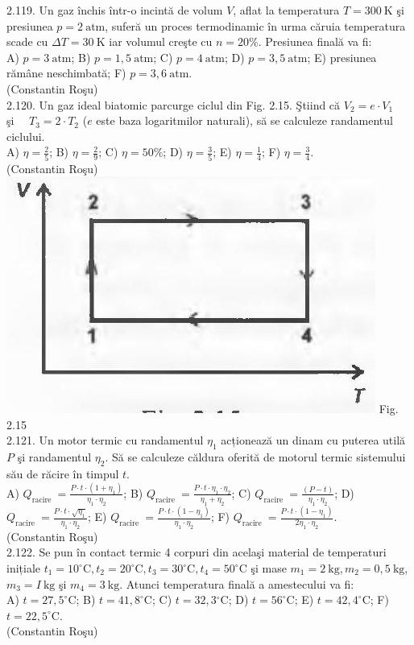 2.119. Un gaz închis într-o incintă de volum $V$, aflat la temperatura $T=300 \mathrm{~K}$ şi presiunea $p=2 \mathrm{~atm}$, suferă un proces termodinamic în urma căruia temperatura scade cu $\Delta T=30 \mathrm{~K}$ iar volumul creşte cu $n=20 \%$. Presiunea finală va fi:\\ A) $p=3 \mathrm{~atm}$; B) $p=1,5 \mathrm{~atm}$; C) $p=4 \mathrm{~atm}$; D) $p=3,5 \mathrm{~atm}$; E) presiunea rămâne neschimbată; F) $p=3,6 \mathrm{~atm}$.\\ (Constantin Roşu)\\

2.120. Un gaz ideal biatomic parcurge ciclul din Fig. 2.15. Ştiind că $V_{2}=e \cdot V_{1} \quad$ şi $\quad T_{3}=2 \cdot T_{2}$ ($e$ este baza logaritmilor naturali), să se calculeze randamentul ciclului.\\ A) $\eta=\frac{2}{5}$; B) $\eta=\frac{2}{9}$; C) $\eta=50 \%$; D) $\eta=\frac{3}{5}$; E) $\eta=\frac{1}{4}$; F) $\eta=\frac{3}{4}$.\\ (Constantin Roşu)\\ \includegraphics[width=0.4\linewidth]{images/2025_07_01_5b3ff9fa0d508c8e9f17g-100} Fig. 2.15\\

2.121. Un motor termic cu randamentul $\eta_{1}$ acționează un dinam cu puterea utilă $P$ şi randamentul $\eta_{2}$. Să se calculeze căldura oferită de motorul termic sistemului său de răcire în timpul $t$.\\ A) $Q_{\text {racire }}=\frac{P \cdot t \cdot\left(1+\eta_{1}\right)}{\eta_{1} \cdot \eta_{2}}$; B) $Q_{\text {racire }}=\frac{P \cdot t \cdot \eta_{1} \cdot \eta_{2}}{\eta_{1}+\eta_{2}}$; C) $Q_{\text {racire }}=\frac{(P-t)}{\eta_{1} \cdot \eta_{2}}$; D) $Q_{\text {racire }}=\frac{P \cdot t \cdot \sqrt{\eta_{1}}}{\eta_{1} \cdot \eta_{2}}$; E) $Q_{\text {racire }}=\frac{P \cdot t \cdot\left(1-\eta_{1}\right)}{\eta_{1} \cdot \eta_{2}}$; F) $Q_{\text {racire }}=\frac{P \cdot t \cdot\left(1-\eta_{1}\right)}{2 \eta_{1} \cdot \eta_{2}}$.\\ (Constantin Roşu)\\

2.122. Se pun în contact termic 4 corpuri din acelaşi material de temperaturi inițiale $t_{1}=10^{\circ} \mathrm{C}, t_{2}=20^{\circ} \mathrm{C}, t_{3}=30^{\circ} \mathrm{C}, t_{4}=50^{\circ} \mathrm{C}$ şi mase $m_{1}=2 \mathrm{~kg}, m_{2}=0,5 \mathrm{~kg}$, $m_{3}=I \mathrm{~kg}$ şi $m_{4}=3 \mathrm{~kg}$. Atunci temperatura finală a amestecului va fi:\\ A) $t=27,5^{\circ} \mathrm{C}$; B) $t=41,8^{\circ} \mathrm{C}$; C) $t=32,3{ }^{\circ} \mathrm{C}$; D) $t=56^{\circ} \mathrm{C}$; E) $t=42,4^{\circ} \mathrm{C}$; F) $t=22,5^{\circ} \mathrm{C}$.\\ (Constantin Roşu)\\

